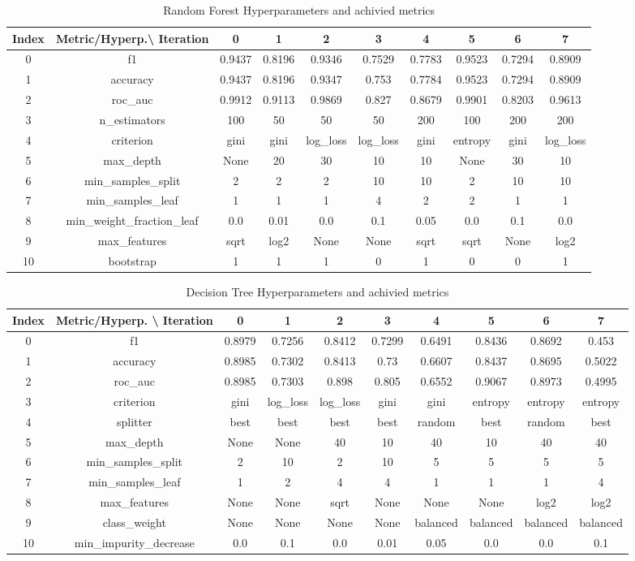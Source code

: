 \documentclass{article}%
\begin{document}
\begin{table}[h!]%
\caption{Random Forest Hyperparameters and achivied metrics}%
\vspace{0.2cm}%
\centering%
\begin{tabular}{|c||c||c||c||c||c||c||c||c||c|}%
\hline%
Index&Metric/Hyperp.\textbackslash{} Iteration&0&1&2&3&4&5&6&7\\%
\hline%
0&f1&0.9437&0.8196&0.9346&0.7529&0.7783&0.9523&0.7294&0.8909\\%
1&accuracy&0.9437&0.8196&0.9347&0.753&0.7784&0.9523&0.7294&0.8909\\%
2&roc\_auc&0.9912&0.9113&0.9869&0.827&0.8679&0.9901&0.8203&0.9613\\%
3&n\_estimators&100&50&50&50&200&100&200&200\\%
4&criterion&gini&gini&log\_loss&log\_loss&gini&entropy&gini&log\_loss\\%
5&max\_depth&None&20&30&10&10&None&30&10\\%
6&min\_samples\_split&2&2&2&10&10&2&10&10\\%
7&min\_samples\_leaf&1&1&1&4&2&2&1&1\\%
8&min\_weight\_fraction\_leaf&0.0&0.01&0.0&0.1&0.05&0.0&0.1&0.0\\%
9&max\_features&sqrt&log2&None&None&sqrt&sqrt&None&log2\\%
10&bootstrap&1&1&1&0&1&0&0&1\\%
\hline%
\end{tabular}%
\end{table}

%


\begin{table}[h!]%
\caption{Decision Tree Hyperparameters and achivied metrics}%
\vspace{0.2cm}%
\centering%
\begin{tabular}{|c||c||c||c||c||c||c||c||c||c|}%
\hline%
Index&Metric/Hyperp. \textbackslash{} Iteration&0&1&2&3&4&5&6&7\\%
\hline%
0&f1&0.8979&0.7256&0.8412&0.7299&0.6491&0.8436&0.8692&0.453\\%
1&accuracy&0.8985&0.7302&0.8413&0.73&0.6607&0.8437&0.8695&0.5022\\%
2&roc\_auc&0.8985&0.7303&0.898&0.805&0.6552&0.9067&0.8973&0.4995\\%
3&criterion&gini&log\_loss&log\_loss&gini&gini&entropy&entropy&entropy\\%
4&splitter&best&best&best&best&random&best&random&best\\%
5&max\_depth&None&None&40&10&40&10&40&40\\%
6&min\_samples\_split&2&10&2&10&5&5&5&5\\%
7&min\_samples\_leaf&1&2&4&4&1&1&1&4\\%
8&max\_features&None&None&sqrt&None&None&None&log2&log2\\%
9&class\_weight&None&None&None&None&balanced&balanced&balanced&balanced\\%
10&min\_impurity\_decrease&0.0&0.1&0.0&0.01&0.05&0.0&0.0&0.1\\%
\hline%
\end{tabular}%
\end{table}
\end{document}
